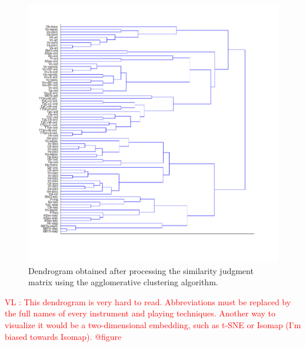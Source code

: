 \documentclass{article}
\newcommand{\vl}[1]{\textcolor{red}{VL : #1}}
\begin{document}
\begin{figure}
\center
\includegraphics[width = \textwidth]{figures/dendrogram.pdf}
\caption{Dendrogram obtained after processing the similarity judgment matrix using the agglomerative clustering algorithm.}
\label{fig:dendrogram}
\end{figure}

\vl{This dendrogram is very hard to read. Abbreviations must be replaced by the full names of every instrument and playing techniques.
Another way to visualize it would be a two-dimensional embedding, such as t-SNE or Isomap (I'm biased towards Isomap). @figure}
\end{document}
